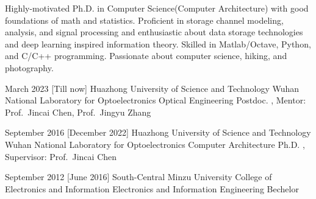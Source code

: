 \documentclass[en]{resume}
\begin{document}
\makeheader

Highly-motivated Ph.D. in Computer Science(Computer Architecture)
with good foundations of math and statistics.
Proficient in storage channel modeling, analysis, and signal processing
and enthusiastic about data storage technologies and deep learning inspired information theory.
Skilled in Matlab/Octave, Python, and C/C++ programming.
Passionate about computer science, hiking, and photography.


\begin{educations}
  \education%
  {March 2023}%
    [Till now]%
    {Huazhong University of Science and Technology}%
    {Wuhan National Laboratory for Optoelectronics}%
    {Optical Engineering}%
    {Postdoc.}%
    {, Mentor: Prof.~Jincai Chen, Prof.~Jingyu Zhang}%

  \separator{0.5ex}
  \education%
    {September 2016}%
    [December 2022]%
    {Huazhong University of Science and Technology}%
    {Wuhan National Laboratory for Optoelectronics}%
    {Computer Architecture}%
    {Ph.D.}%
    {, Supervisor: Prof.~Jincai Chen}%

    \separator{0.5ex}
  \education%
    {September 2012}%
    [June 2016]%
    {South-Central Minzu University}%
    {College of Electronics and Information}%
    {Electronics and Information Engineering}%
    {Bechelor}%
    {}%

\end{educations}
\end{document}
